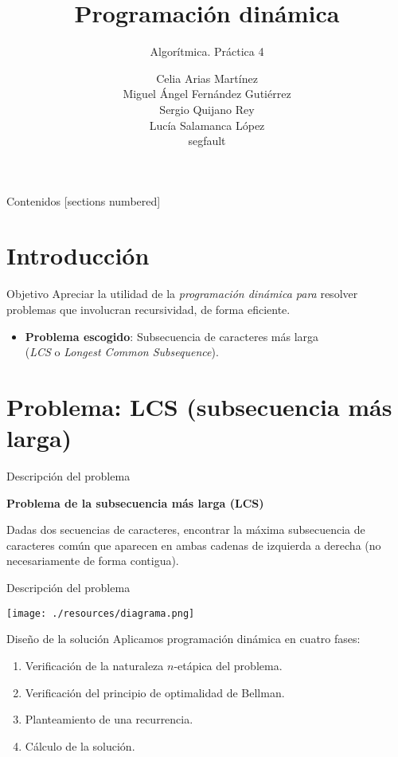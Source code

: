 \documentclass[10pt, xcolor=table]{beamer}
\title{Programación dinámica}
\subtitle{Algorítmica. \alert{Práctica 4}}
\date{}
\author{Celia Arias Martínez\\Miguel Ángel Fernández Gutiérrez\\Sergio Quijano Rey\\Lucía Salamanca López\\[4pt]\footnotesize{segfault}}
\begin{document}
\maketitle

\begin{frame}{Contenidos}
	[sections numbered]
	\tableofcontents[]
\end{frame}


\section{Introducción}

\begin{frame}{Objetivo}
Apreciar la utilidad de la \emph{programación dinámica para} resolver problemas que involucran recursividad, de forma eficiente.
\begin{itemize}
	\item \textbf{Problema escogido}: Subsecuencia de caracteres más larga\\(\textit{LCS} o \textit{Longest Common Subsequence}).
\end{itemize}

\end{frame}

\section{Problema: LCS (subsecuencia más larga)}
\begin{frame}{Descripción del problema}
\begin{center}
	\textbf{\large{Problema de la subsecuencia más larga (LCS)}}
\end{center}

Dadas dos secuencias de caracteres, encontrar la máxima subsecuencia de caracteres común que aparecen en ambas cadenas de izquierda a derecha (no necesariamente de forma contigua).
\end{frame}

\begin{frame}[fragile]{Descripción del problema}
\vspace{0.55cm}
	\begin{center}
	\texttt{[image: ./resources/diagrama.png]}
\end{center}
\end{frame}

\begin{frame}{Diseño de la solución}
Aplicamos programación dinámica en cuatro fases:

\begin{enumerate}
	\item Verificación de la naturaleza $n$-etápica del problema.
	\item Verificación del principio de optimalidad de Bellman.
	\item Planteamiento de una recurrencia. 
	\item Cálculo de la solución.
\end{enumerate}
\end{frame}
\end{document}

